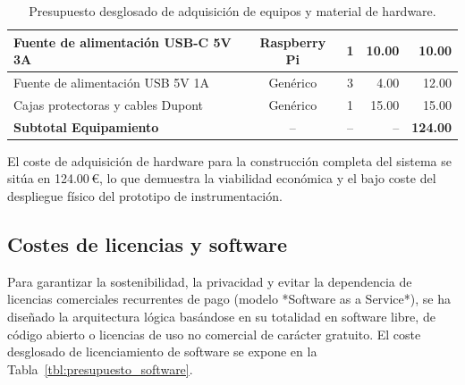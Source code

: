 \begin{table}[H]
\begin{tabular}{|l|c|c|r|r|}
        \parbox[c]{4.2cm}{\vspace{0.1cm}Fuente de alimentación USB-C 5V 3A\vspace{0.1cm}}  & Raspberry Pi  & 1 & 10.00 & 10.00 \\ \hline
        \parbox[c]{4.2cm}{\vspace{0.1cm}Fuente de alimentación USB 5V 1A\vspace{0.1cm}}    & Genérico      & 3 & 4.00  & 12.00 \\ \hline
        \parbox[c]{4.2cm}{\vspace{0.1cm}Cajas protectoras y cables Dupont\vspace{0.1cm}}   & Genérico      & 1 & 15.00 & 15.00 \\ \hline
        \parbox[c]{4.2cm}{\vspace{0.15cm}\textbf{Subtotal Equipamiento}\vspace{0.15cm}}   & --            & -- & --   & \textbf{124.00} \\ \hline
    \end{tabular}
    \caption{Presupuesto desglosado de adquisición de equipos y material de hardware.}
    \label{tbl:presupuesto_hardware}
\end{table}

El coste de adquisición de hardware para la construcción completa del sistema se sitúa en 124.00\,\euro, lo que demuestra la viabilidad económica y el bajo coste del despliegue físico del prototipo de instrumentación.

\subsection{Costes de licencias y software}
\label{sec:costes_software}
Para garantizar la sostenibilidad, la privacidad y evitar la dependencia de licencias comerciales recurrentes de pago (modelo *Software as a Service*), se ha diseñado la arquitectura lógica basándose en su totalidad en software libre, de código abierto o licencias de uso no comercial de carácter gratuito. El coste desglosado de licenciamiento de software se expone en la Tabla~\ref{tbl:presupuesto_software}.


